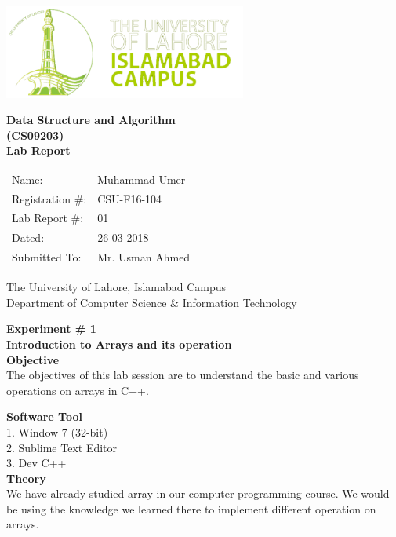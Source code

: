 \documentclass[11pt]{article}            %
\begin{document}
\begin{titlepage}
    \centering
  \vfill
    \includegraphics[width=8cm]{uni_logo.png} \\ 
	\vskip2cm
    {\bfseries\Large
	Data Structure and Algorithm \\ (CS09203)\\
	
	\vskip2cm
	Lab Report 
	 
	\vskip2cm
	}    

\begin{center}
\begin{tabular}{ l l  } 

Name: & Muhammad Umer \\ 
Registration \#: & CSU-F16-104 \\ 
Lab Report \#: & 01 \\ 
 Dated:& 26-03-2018\\ 
Submitted To:& Mr. Usman Ahmed\\ 

\end{tabular}
\end{center}
    \vfill
    The University of Lahore, Islamabad Campus\\
Department of Computer Science \& Information Technology
\end{titlepage}


    
    {\bfseries\Large
\centering
	Experiment \# 1 \\

Introduction to Arrays and its operation\\
	
	}    
 \vskip1cm
 \textbf {Objective}\\ The objectives of this lab session are to understand the basic and various operations on arrays in C++.
 
 \textbf {Software Tool} \\
1.  Window 7 (32-bit)\\
2. Sublime Text Editor\\
3. Dev C++\\

\textbf{Theory }  \\            
We have already studied array in our computer programming course. We would be using the knowledge we learned there to implement different operation on arrays. \\
\end{document}

